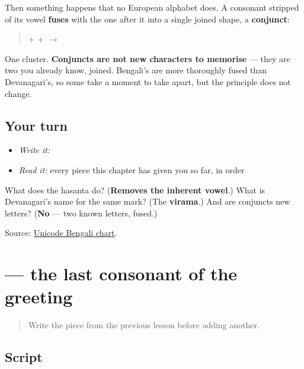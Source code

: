 Then something happens that no European alphabet does. A consonant stripped of its vowel \textbf{fuses} with the one after it into a single joined shape, a \textbf{conjunct}:

\begin{quote}
\textbf{} + \textbf{} + \textbf{} $\to$ \textbf{}
\end{quote}

One cluster. \textbf{Conjuncts are not new characters to memorise} — they are two you already know, joined. Bengali's are more thoroughly fused than Devanagari's, so some take a moment to take apart, but the principle does not change.

\subsection*{Your turn}
\begin{itemize}
\raggedright
  \item \emph{Write it:} 
  \item \emph{Read it:} every piece this chapter has given you so far, in order
\end{itemize}

\begin{tcolorbox}[breakable,colback=teal!4,colframe=teal!35!black,title={Before you move on}]
What does the hasanta do? (\textbf{Removes the inherent vowel}.) What is Devanagari's name for the same mark? (The \textbf{virama}.) And are conjuncts new letters? (\textbf{No} — two known letters, fused.)

Source: \href{https://www.unicode.org/charts/PDF/U0980.pdf}{Unicode Bengali chart}.
\end{tcolorbox}
\section[rô]{ — the last consonant of the greeting}

\label{lesson:BN-W01-ra}



\begin{quote}
Write the piece from the previous lesson before adding another.
\end{quote}

\subsection*{Script}
\begin{quote}
\end{quote}

